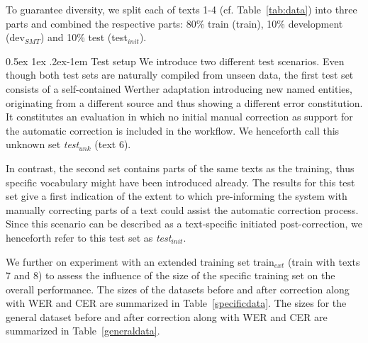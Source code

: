 \documentclass[11pt,letterpaper]{article}
\makeatletter
\renewcommand{\paragraph}{%
  \@startsection{paragraph}{4}%
  {\z@}{0.5ex \@plus 1ex \@minus .2ex}{-1em}%
  {\normalfont\normalsize\bfseries}%
}
\makeatother
\begin{document}
To guarantee diversity, we split each of texts 1-4 (cf. Table~\ref{tab:data}) into three parts and combined the respective parts: 80\% train (train), 10\% development (dev$_{SMT}$) and 10\% test (test$_{init}$). 

\paragraph{Test setup}
We introduce two different test scenarios. Even though both test sets are naturally compiled from unseen data, the first test set consists of a self-contained Werther adaptation introducing new named entities, originating from a different source and thus showing a different error constitution. It constitutes an evaluation in which no initial manual correction as support for the automatic correction is included in the workflow. We henceforth call this unknown set \textit{test$_{unk}$} (text 6). 

In contrast, the second set contains parts of the same texts as the training, thus specific vocabulary might have been introduced already. The results for this test set give a first indication of the extent to which pre-informing the system with manually correcting parts of a text could assist the automatic correction process. Since this scenario can be described as a text-specific initiated post-correction, we henceforth refer to this test set as \textit{test$_{init}$}.


We further on experiment with an extended training set train$_{ext}$ (train with texts 7 and 8) to assess the influence of the size of the specific training set on the overall performance. The sizes of the datasets before and after correction along with WER and CER are summarized in Table~\ref{specificdata}. The sizes for the general dataset before and after correction along with WER and CER  are summarized in Table~\ref{generaldata}.

\begin{table}
\caption{DTA parallel corpus of OCR text and corrected text showing the
number of tokens before and after post-correction along with WER and CER}
\label{generaldata}
\end{table}
\end{document}
